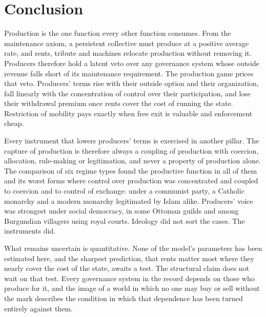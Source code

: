 \documentclass[11pt,letterpaper]{article}
\theoremstyle{definition}
\theoremstyle{remark}
\begin{document}
\section{Conclusion}
\label{sec:conclusion}

Production is the one function every other function consumes. From the maintenance axiom, a persistent collective must produce at a positive average rate, and rents, tribute and machines relocate production without removing it. Producers therefore hold a latent veto over any governance system whose outside revenue falls short of its maintenance requirement. The production game prices that veto. Producers' terms rise with their outside option and their organization, fall linearly with the concentration of control over their participation, and lose their withdrawal premium once rents cover the cost of running the state. Restriction of mobility pays exactly when free exit is valuable and enforcement cheap.

Every instrument that lowers producers' terms is exercised in another pillar. The capture of production is therefore always a coupling of production with coercion, allocation, rule-making or legitimation, and never a property of production alone. The comparison of six regime types found the productive function in all of them and its worst forms where control over production was concentrated and coupled to coercion and to control of exchange: under a communist party, a Catholic monarchy and a modern monarchy legitimated by Islam alike. Producers' voice was strongest under social democracy, in some Ottoman guilds and among Burgundian villagers using royal courts. Ideology did not sort the cases. The instruments did.

What remains uncertain is quantitative. None of the model's parameters has been estimated here, and the sharpest prediction, that rents matter most where they nearly cover the cost of the state, awaits a test. The structural claim does not wait on that test. Every governance system in the record depends on those who produce for it, and the image of a world in which no one may buy or sell without the mark describes the condition in which that dependence has been turned entirely against them.
\end{document}
